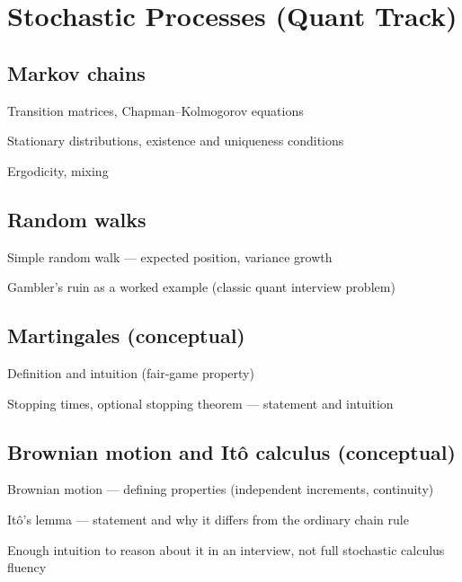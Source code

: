 \documentclass[11pt]{article}
\begin{document}
\section{Stochastic Processes (Quant Track)}

\subsection{Markov chains}
\begin{tasklist}
    \item Transition matrices, Chapman--Kolmogorov equations
    \item Stationary distributions, existence and uniqueness conditions
    \item Ergodicity, mixing
\end{tasklist}

\subsection{Random walks}
\begin{tasklist}
    \item Simple random walk — expected position, variance growth
    \item Gambler's ruin as a worked example (classic quant interview problem)
\end{tasklist}

\subsection{Martingales (conceptual)}
\begin{tasklist}
    \item Definition and intuition (fair-game property)
    \item Stopping times, optional stopping theorem — statement and intuition
\end{tasklist}

\subsection{Brownian motion and Itô calculus (conceptual)}
\begin{tasklist}
    \item Brownian motion — defining properties (independent increments, continuity)
    \item Itô's lemma — statement and why it differs from the ordinary chain rule
    \item Enough intuition to reason about it in an interview, not full stochastic calculus fluency
\end{tasklist}
\end{document}
